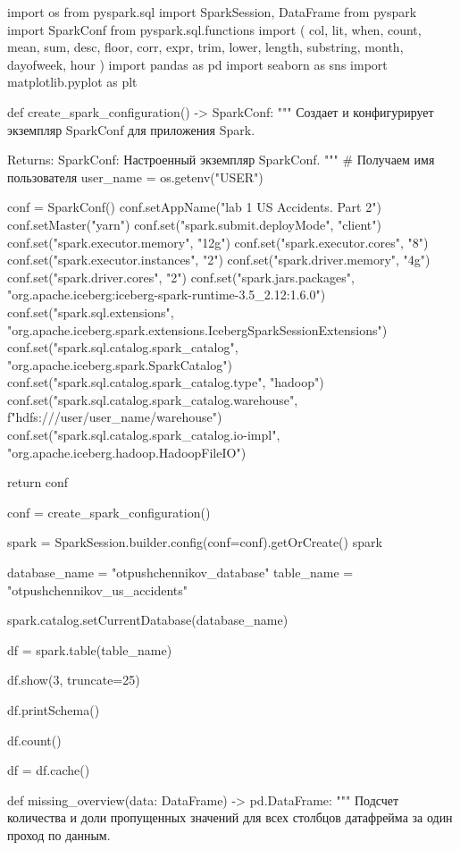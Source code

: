 \begin{code}
import os
from pyspark.sql import SparkSession, DataFrame
from pyspark import SparkConf
from pyspark.sql.functions import (
    col,
    lit,
    when,
    count,
    mean,
    sum,
    desc,
    floor,
    corr,
    expr,
    trim,
    lower,
    length,
    substring,
    month,
    dayofweek,
    hour
)
import pandas as pd
import seaborn as sns
import matplotlib.pyplot as plt

def create_spark_configuration() -> SparkConf:
    """
    Создает и конфигурирует экземпляр SparkConf для приложения Spark.

    Returns:
        SparkConf: Настроенный экземпляр SparkConf.
    """
    # Получаем имя пользователя
    user_name = os.getenv("USER")
    
    conf = SparkConf()
    conf.setAppName("lab 1 US Accidents. Part 2")
    conf.setMaster("yarn")
    conf.set("spark.submit.deployMode", "client")
    conf.set("spark.executor.memory", "12g")
    conf.set("spark.executor.cores", "8")
    conf.set("spark.executor.instances", "2")
    conf.set("spark.driver.memory", "4g")
    conf.set("spark.driver.cores", "2")
    conf.set("spark.jars.packages", "org.apache.iceberg:iceberg-spark-runtime-3.5_2.12:1.6.0")
    conf.set("spark.sql.extensions", "org.apache.iceberg.spark.extensions.IcebergSparkSessionExtensions")
    conf.set("spark.sql.catalog.spark_catalog", "org.apache.iceberg.spark.SparkCatalog")
    conf.set("spark.sql.catalog.spark_catalog.type", "hadoop")
    conf.set("spark.sql.catalog.spark_catalog.warehouse", f"hdfs:///user/{user_name}/warehouse")
    conf.set("spark.sql.catalog.spark_catalog.io-impl", "org.apache.iceberg.hadoop.HadoopFileIO")

    return conf

conf = create_spark_configuration()

spark = SparkSession.builder.config(conf=conf).getOrCreate()
spark

database_name = "otpushchennikov_database"
table_name = "otpushchennikov_us_accidents"

spark.catalog.setCurrentDatabase(database_name)

df = spark.table(table_name)

df.show(3, truncate=25)

df.printSchema()

df.count()

df = df.cache()

def missing_overview(data: DataFrame) -> pd.DataFrame:
    """
    Подсчет количества и доли пропущенных значений для всех столбцов
    датафрейма за один проход по данным.


\end{code}
